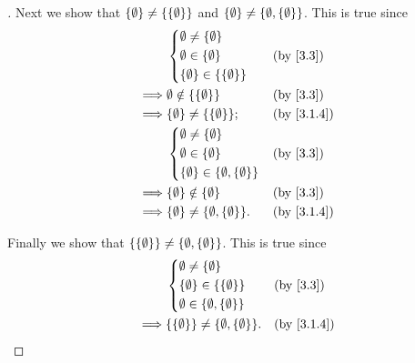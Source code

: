 \begin{proof}[]
  Next we show that \(\left\lbrace\emptyset\right\rbrace \neq \left\lbrace\left\lbrace\emptyset\right\rbrace\right\rbrace\) and \(\left\lbrace\emptyset\right\rbrace \neq \left\lbrace\emptyset, \left\lbrace\emptyset\right\rbrace\right\rbrace\).
  This is true since
  \begin{align*}
             & \begin{dcases}
                 \emptyset \neq \set{\emptyset} \\
                 \emptyset \in \set{\emptyset}  \\
                 \set{\emptyset} \in \set{\set{\emptyset}}
               \end{dcases}            &  & \by{3.3}                             \\
    \implies & \emptyset \notin \set{\set{\emptyset}}                       &  & \by{3.3}   \\
    \implies & \set{\emptyset} \neq \set{\set{\emptyset}};                  &  & \by{3.1.4} \\
             & \begin{dcases}
                 \emptyset \neq \set{\emptyset} \\
                 \emptyset \in \set{\emptyset}  \\
                 \set{\emptyset} \in \set{\emptyset, \set{\emptyset}}
               \end{dcases} &  & \by{3.3}                  \\
    \implies & \set{\emptyset} \notin \set{\emptyset}                       &  & \by{3.3}   \\
    \implies & \set{\emptyset} \neq \set{\emptyset, \set{\emptyset}}.       &  & \by{3.1.4}
  \end{align*}

  Finally we show that \(\left\lbrace\left\lbrace\emptyset\right\rbrace\right\rbrace \neq \left\lbrace\emptyset, \left\lbrace\emptyset\right\rbrace\right\rbrace\).
  This is true since
  \begin{align*}
             & \begin{dcases}
                 \emptyset \neq \set{\emptyset}                 \\
                 \set{\emptyset} \in \set{\set{\emptyset}}      \\
                 \emptyset \in \set{\emptyset, \set{\emptyset}} \\
               \end{dcases}    &  & \by{3.3}                       \\
    \implies & \set{\set{\emptyset}} \neq \set{\emptyset, \set{\emptyset}}. &  & \by{3.1.4}
  \end{align*}
\end{proof}

